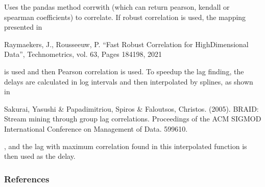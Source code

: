 \documentclass[letterpaper,10pt,english]{sphinxmanual}
\begin{document}
\begin{fulllineitems}
\sphinxAtStartPar
Uses the pandas method corrwith (which can return pearson, kendall or spearman coefficients) to correlate. If robust
correlation is used, the mapping presented in \sphinxstepexplicit %
\begin{footnote}[1]\label{\thesphinxscope.1}%
\sphinxAtStartFootnote
Raymaekers, J., Rousseeuw, P. “Fast Robust Correlation for High\sphinxhyphen{}Dimensional Data”, Technometrics, vol. 63, Pages 184\sphinxhyphen{}198, 2021
%
\end{footnote} is used and then Pearson correlation is used. To speedup the lag finding,
the delays are calculated in log intervals and then interpolated by splines, as shown in \sphinxstepexplicit %
\begin{footnote}[2]\label{\thesphinxscope.2}%
\sphinxAtStartFootnote
Sakurai, Yasushi \& Papadimitriou, Spiros \& Faloutsos, Christos. (2005). BRAID: Stream mining through group lag correlations. Proceedings of the ACM SIGMOD International Conference on Management of Data. 599\sphinxhyphen{}610.
%
\end{footnote}, and the lag with maximum correlation
found in this interpolated function is then used as the delay.
\subsubsection*{References}

\end{fulllineitems}

\end{document}

